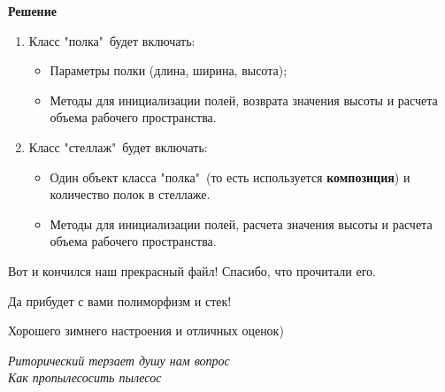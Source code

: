 {\bf Решение}

\begin{enumerate}
\item Класс "полка"\ будет включать:
\begin{itemize}
    \item Параметры полки (длина, ширина, высота);
    \item Методы для инициализации полей, возврата значения высоты и расчета объема рабочего пространства. 
\end{itemize}

\item Класс "стеллаж"\ будет включать:
\begin{itemize} 
    \item Один объект класса "полка"\ (то есть используется {\bf композиция}) 
    и количество полок в стеллаже. 
    \item Методы для инициализации полей, расчета значения высоты и расчета объема рабочего пространства. 
\end{itemize}
\end{enumerate}

{}



{}



\vspace*{250pt}
\noindent\makebox[\linewidth]{\rule{\paperwidth}{0.4pt}}
\vspace*{20pt}
{\begin{myquote2}
\begin{center}
    \bf \begin{small}{
    Вот и кончился наш прекрасный файл! Спасибо, что прочитали его.

    Да прибудет с вами полиморфизм и стек!

    Хорошего зимнего настроения и отличных оценок)

}\end{small}\end{center}
\begin{flushright}
    \textit{Риторический терзает душу нам вопрос\\
    Как пропылесосить пылесос}
    \end{flushright}
\end{myquote2}}

\vspace*{20pt}
\noindent\makebox[\linewidth]{\rule{\paperwidth}{0.4pt}}
\vspace*{20pt}
\newpage
\let\clearpage\relax





